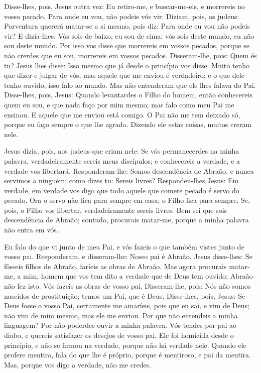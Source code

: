 Disse-lhes, pois, Jesus outra vez: Eu retiro-me, e buscar-me-eis,
e morrereis no vosso pecado. Para onde eu vou, não podeis vós vir.
Diziam, pois, os judeus: Porventura quererá matar-se a si
mesmo, pois diz: Para onde eu vou não podeis vir? E
dizia-lhes: Vós sois de baixo, eu sou de cima; vós sois deste mundo,
eu não sou deste mundo. Por isso vos disse que morrereis em
vossos pecados, porque se não crerdes que eu sou, morrereis em
vossos pecados. Disseram-lhe, pois: Quem és tu? Jesus lhes
disse: Isso mesmo que já desde o princípio vos disse. Muito
tenho que dizer e julgar de vós, mas aquele que me enviou é
verdadeiro; e o que dele tenho ouvido, isso falo ao mundo.
Mas não entenderam que ele lhes falava do Pai.
Disse-lhes, pois, Jesus: Quando levantardes o Filho do homem,
então conhecereis quem eu sou, e que nada faço por mim mesmo; mas
falo como meu Pai me ensinou. E aquele que me enviou está
comigo. O Pai não me tem deixado só, porque eu faço sempre o que lhe
agrada. Dizendo ele estas coisas, muitos creram nele.

Jesus dizia, pois, aos judeus que criam nele: Se vós
permanecerdes na minha palavra, verdadeiramente sereis meus
discípulos; e conhecereis a verdade, e a verdade vos
libertará. Responderam-lhe: Somos descendência de Abraão, e
nunca servimos a ninguém; como dizes tu: Sereis livres?
Respondeu-lhes Jesus: Em verdade, em verdade vos digo que
todo aquele que comete pecado é servo do pecado. Ora o servo
não fica para sempre em casa; o Filho fica para sempre. Se,
pois, o Filho vos libertar, verdadeiramente sereis livres.
Bem sei que sois descendência de Abraão; contudo, procurais
matar-me, porque a minha palavra não entra em vós.

Eu falo do que vi junto de meu Pai, e vós fazeis o que também
vistes junto de vosso pai. Responderam, e disseram-lhe: Nosso
pai é Abraão. Jesus disse-lhes: Se fôsseis filhos de Abraão, faríeis
as obras de Abraão. Mas agora procurais matar-me, a mim,
homem que vos tem dito a verdade que de Deus tem ouvido; Abraão não
fez isto. Vós fazeis as obras de vosso pai. Disseram-lhe,
pois: Nós não somos nascidos de prostituição; temos um Pai, que é
Deus. Disse-lhes, pois, Jesus: Se Deus fosse o vosso Pai,
certamente me amaríeis, pois que eu saí, e vim de Deus; não vim de
mim mesmo, mas ele me enviou. Por que não entendeis a minha
linguagem? Por não poderdes ouvir a minha palavra. Vós tendes
por pai ao diabo, e quereis satisfazer os desejos de vosso pai. Ele
foi homicida desde o princípio, e não se firmou na verdade, porque
não há verdade nele. Quando ele profere mentira, fala do que lhe é
próprio, porque é mentiroso, e pai da mentira. Mas, porque
vos digo a verdade, não me credes.


